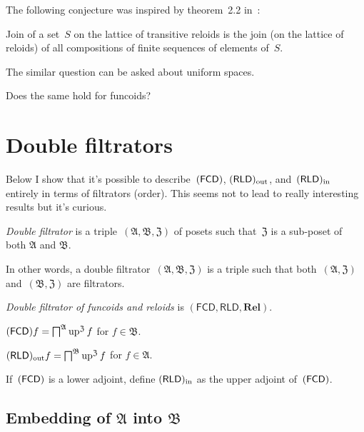 The following conjecture was inspired by theorem~2.2 in~\cite{Weber2007}:

\begin{conjecture}
Join of a set~$S$ on the lattice of transitive reloids is
the join (on the lattice of reloids) of all compositions of finite sequences of elements of~$S$.
\end{conjecture}

The similar question can be asked about uniform spaces.

Does the same hold for funcoids?

\section{Double filtrators}

Below I show that it's possible to describe~$(\mathsf{FCD})$, $(\mathsf{RLD})_{\mathrm{out}}$, and~$(\mathsf{RLD})_{\mathrm{in}}$ entirely in terms of filtrators (order). This seems not to lead to really interesting results but it's curious.

\begin{defn}
 \emph{Double filtrator} is a triple~$(\mathfrak{A},\mathfrak{B},\mathfrak{Z})$ of posets such that~$\mathfrak{Z}$ is a sub-poset of both $\mathfrak{A}$ and $\mathfrak{B}$.
\end{defn}

In other words, a double filtrator~$(\mathfrak{A},\mathfrak{B},\mathfrak{Z})$ is a triple such that both~$(\mathfrak{A},\mathfrak{Z})$ and~$(\mathfrak{B},\mathfrak{Z})$ are filtrators.

\begin{defn}
 \emph{Double filtrator of funcoids and reloids} is
 $(\mathsf{FCD},\mathsf{RLD},\mathbf{Rel})$.
\end{defn}

\begin{defn}
 $(\mathsf{FCD}) f = \bigsqcap^{\mathfrak{A}}\operatorname{up}^{\mathfrak{Z}} f$ for $f\in\mathfrak{B}$.
\end{defn}

\begin{defn}
 $(\mathsf{RLD})_{\mathrm{out}} f = \bigsqcap^{\mathfrak{B}}\operatorname{up}^{\mathfrak{Z}} f$ for $f\in\mathfrak{A}$.
\end{defn}

\begin{defn}
 If~$(\mathsf{FCD})$ is a lower adjoint, define $(\mathsf{RLD})_{\mathrm{in}}$ as the
 upper adjoint of~$(\mathsf{FCD})$.
\end{defn}

\subsection{Embedding of $\mathfrak{A}$ into $\mathfrak{B}$}

